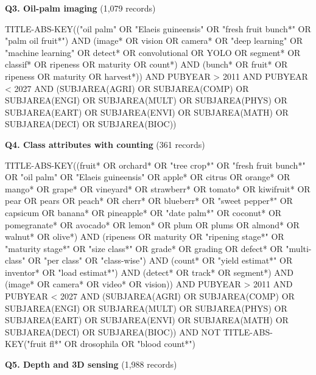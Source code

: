 \par\medskip\noindent\textbf{Q3. Oil-palm imaging} (1,079 records)\par\nobreak\smallskip
{\noindent\scriptsize\ttfamily\raggedright TITLE-ABS-KEY(("oil palm" OR "Elaeis guineensis" OR "fresh fruit bunch*" OR "palm oil fruit*") AND (image* OR vision OR camera* OR "deep learning" OR "machine learning" OR detect* OR convolutional OR YOLO OR segment* OR classif* OR ripeness OR maturity OR count*) AND (bunch* OR fruit* OR ripeness OR maturity OR harvest*)) AND PUBYEAR > 2011 AND PUBYEAR < 2027 AND (SUBJAREA(AGRI) OR SUBJAREA(COMP) OR SUBJAREA(ENGI) OR SUBJAREA(MULT) OR SUBJAREA(PHYS) OR SUBJAREA(EART) OR SUBJAREA(ENVI) OR SUBJAREA(MATH) OR SUBJAREA(DECI) OR SUBJAREA(BIOC))\par}
\par\medskip\noindent\textbf{Q4. Class attributes with counting} (361 records)\par\nobreak\smallskip
{\noindent\scriptsize\ttfamily\raggedright TITLE-ABS-KEY((fruit* OR orchard* OR "tree crop*" OR "fresh fruit bunch*" OR "oil palm" OR "Elaeis guineensis" OR apple* OR citrus OR orange* OR mango* OR grape* OR vineyard* OR strawberr* OR tomato* OR kiwifruit* OR pear OR pears OR peach* OR cherr* OR blueberr* OR "sweet pepper*" OR capsicum OR banana* OR pineapple* OR "date palm*" OR coconut* OR pomegranate* OR avocado* OR lemon* OR plum OR plums OR almond* OR walnut* OR olive*) AND (ripeness OR maturity OR "ripening stage*" OR "maturity stage*" OR "size class*" OR grade* OR grading OR defect* OR "multi-class" OR "per class" OR "class-wise") AND (count* OR "yield estimat*" OR inventor* OR "load estimat*") AND (detect* OR track* OR segment*) AND (image* OR camera* OR video* OR vision)) AND PUBYEAR > 2011 AND PUBYEAR < 2027 AND (SUBJAREA(AGRI) OR SUBJAREA(COMP) OR SUBJAREA(ENGI) OR SUBJAREA(MULT) OR SUBJAREA(PHYS) OR SUBJAREA(EART) OR SUBJAREA(ENVI) OR SUBJAREA(MATH) OR SUBJAREA(DECI) OR SUBJAREA(BIOC)) AND NOT TITLE-ABS-KEY("fruit fl*" OR drosophila OR "blood count*")\par}
\par\medskip\noindent\textbf{Q5. Depth and 3D sensing} (1,988 records)\par\nobreak\smallskip

